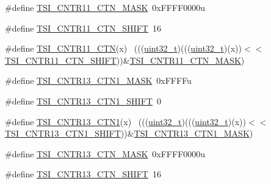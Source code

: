 \begin{DoxyCompactItemize}
\item 
\#define \hyperlink{group___t_s_i___register___masks_ga12ceb148771123d3f985c95857174665}{T\+S\+I\+\_\+\+C\+N\+T\+R11\+\_\+\+C\+T\+N\+\_\+\+M\+A\+SK}~0x\+F\+F\+F\+F0000u
\item 
\#define \hyperlink{group___t_s_i___register___masks_ga72c3ce0896c8ead8cf9cb28dc3bbf082}{T\+S\+I\+\_\+\+C\+N\+T\+R11\+\_\+\+C\+T\+N\+\_\+\+S\+H\+I\+FT}~16
\item 
\#define \hyperlink{group___t_s_i___register___masks_ga1a9e70bef0e36f21e2432aef2cc97fc7}{T\+S\+I\+\_\+\+C\+N\+T\+R11\+\_\+\+C\+TN}(x)                                            ~(((\hyperlink{_p_e___types_8h_a33594304e786b158f3fb30289278f5af}{uint32\+\_\+t})(((\hyperlink{_p_e___types_8h_a33594304e786b158f3fb30289278f5af}{uint32\+\_\+t})(x))$<$$<$\hyperlink{group___t_s_i___register___masks_ga72c3ce0896c8ead8cf9cb28dc3bbf082}{T\+S\+I\+\_\+\+C\+N\+T\+R11\+\_\+\+C\+T\+N\+\_\+\+S\+H\+I\+FT}))\&\hyperlink{group___t_s_i___register___masks_ga12ceb148771123d3f985c95857174665}{T\+S\+I\+\_\+\+C\+N\+T\+R11\+\_\+\+C\+T\+N\+\_\+\+M\+A\+SK})
\item 
\#define \hyperlink{group___t_s_i___register___masks_ga9671deb8a78c5ef99068b0244f19f125}{T\+S\+I\+\_\+\+C\+N\+T\+R13\+\_\+\+C\+T\+N1\+\_\+\+M\+A\+SK}~0x\+F\+F\+F\+Fu
\item 
\#define \hyperlink{group___t_s_i___register___masks_gad19e50775ced3a5322d93b67c6019536}{T\+S\+I\+\_\+\+C\+N\+T\+R13\+\_\+\+C\+T\+N1\+\_\+\+S\+H\+I\+FT}~0
\item 
\#define \hyperlink{group___t_s_i___register___masks_ga303046b18a5643a3d2c41c7285e0efa7}{T\+S\+I\+\_\+\+C\+N\+T\+R13\+\_\+\+C\+T\+N1}(x)                                          ~(((\hyperlink{_p_e___types_8h_a33594304e786b158f3fb30289278f5af}{uint32\+\_\+t})(((\hyperlink{_p_e___types_8h_a33594304e786b158f3fb30289278f5af}{uint32\+\_\+t})(x))$<$$<$\hyperlink{group___t_s_i___register___masks_gad19e50775ced3a5322d93b67c6019536}{T\+S\+I\+\_\+\+C\+N\+T\+R13\+\_\+\+C\+T\+N1\+\_\+\+S\+H\+I\+FT}))\&\hyperlink{group___t_s_i___register___masks_ga9671deb8a78c5ef99068b0244f19f125}{T\+S\+I\+\_\+\+C\+N\+T\+R13\+\_\+\+C\+T\+N1\+\_\+\+M\+A\+SK})
\item 
\#define \hyperlink{group___t_s_i___register___masks_gac4b6ed4489dd39029223b49be774965a}{T\+S\+I\+\_\+\+C\+N\+T\+R13\+\_\+\+C\+T\+N\+\_\+\+M\+A\+SK}~0x\+F\+F\+F\+F0000u
\item 
\#define \hyperlink{group___t_s_i___register___masks_gaffd92baf7411ffdc73289bcf96764e3a}{T\+S\+I\+\_\+\+C\+N\+T\+R13\+\_\+\+C\+T\+N\+\_\+\+S\+H\+I\+FT}~16

\end{DoxyCompactItemize}
